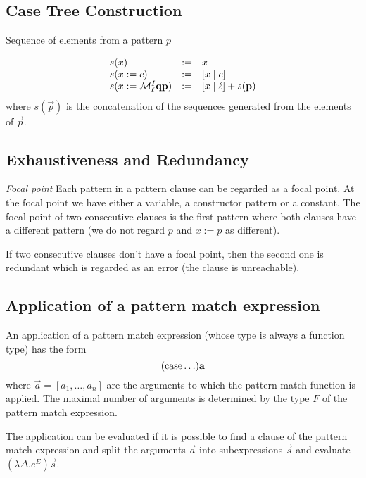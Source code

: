 \subsection{Case Tree Construction}

Sequence of elements from a pattern $p$

$$
\begin{array}{lll}
    s(x) &:=& x
    \\
    s(x:=c) &:=& [x \mid c]
    \\
    s(x:= {\cal M}^I_\ell {\mathbf q} {\mathbf p})
    &:=&
    [x \mid \ell] + s({\mathbf p})
\end{array}
$$
where $s(\vec p)$ is the concatenation of the sequences generated from the
elements of $\vec p$.





\subsection{Exhaustiveness and Redundancy}

\emph{Focal point}
Each pattern in a pattern clause can be regarded as a focal
point. At the focal point we have either a variable, a constructor pattern or a
constant. The focal point of two consecutive clauses is the first pattern where
both clauses have a different pattern (we do not regard $p$ and $x:=p$ as
different).

If two consecutive clauses don't have a focal point, then the second one is
redundant which is regarded as an error (the clause is unreachable).








\subsection{Application of a pattern match expression}

An application of a pattern match expression (whose type is always a function
type) has the form
$$
({\text{case}} \ldots) {\mathbf a}
$$
where $\vec a = [a_1, \ldots, a_n]$ are the arguments to which the pattern match
function is applied. The maximal number of arguments is determined by the type
$F$ of the pattern match expression.

The application can be evaluated if it is possible to find a clause of the
pattern match expression and split the arguments $\vec a$ into subexpressions
$\vec s$ and evaluate $(\lambda \Delta. e^E) \vec s$.




